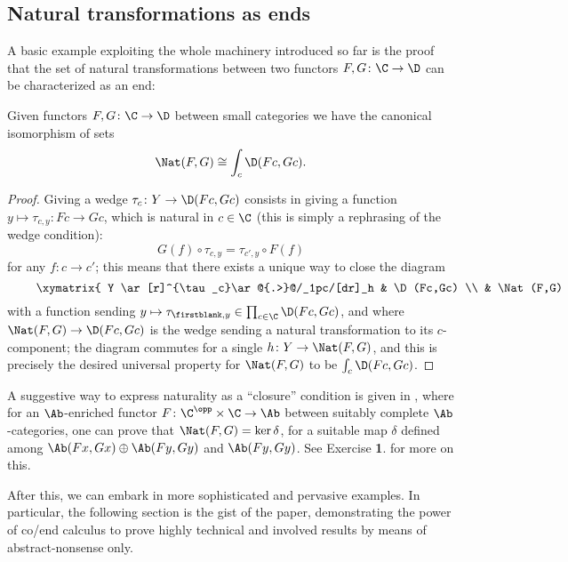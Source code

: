 \subsection{Natural transformations as ends}
A basic example exploiting the whole machinery introduced so far is the proof that the set of natural transformations between two functors $F,G\colon \C\to \D$ can be characterized as an end:
\begin{theorem}\label{naturalu}
Given functors $F,G\colon \C\to \D$ between small categories we have the canonical isomorphism of sets
\[
\Nat(F,G)\cong \int_c \D(Fc,Gc).
\]
\end{theorem}
\begin{proof}
Giving a wedge $\tau_c\colon Y\to \D(Fc,Gc)$ consists in giving a function $y\mapsto \tau_{c,y}\colon Fc\to Gc$, which is natural in $c\in \C$ (this is simply a rephrasing of the wedge condition):
\[
G(f)\circ \tau_{c,y} = \tau_{c',y}\circ F(f)
\]
for any $f\colon c\to c'$; this means that there exists a unique way to close the diagram
\[
\vcenter{\xymatrix{
Y \ar[r]^{\tau_c}\ar@{.>}@/_1pc/[dr]_h & \D(Fc,Gc)  \\
 & \Nat(F,G) \ar[u]
}}
\]
with a function sending $y\mapsto \tau_{\firstblank,y}\in \prod_{c\in\C} \D(Fc,Gc)$, and where $\Nat(F,G)\to\D(Fc,Gc)$ is the wedge sending a natural transformation to its $c$\hyp{}component; the diagram commutes for a single $h\colon Y\to \Nat(F,G)$, and this is precisely the desired universal property for $\Nat(F,G)$ to be $\int_c\D(Fc,Gc)$.
\end{proof}
\begin{remark}\label{keryoneda}
A suggestive way to express naturality as a ``closure'' condition is given in \cite[\textbf{4.1.1}]{yoneda}, where for an $\Ab$\hyp{}enriched functor $F\colon \C^\opp\times \C\to \Ab$ between suitably complete $\Ab$\hyp{}categories, one can prove that $\Nat(F,G)=\ker\delta$, for a suitable map $\delta$ defined among $\Ab(Fx, Gx)\oplus \Ab(Fy, Gy)$ and $\Ab(Fy, Gy)$. See Exercise \textbf{1}. for more on this.
\end{remark}
After this, we can embark in more sophisticated and pervasive examples. In particular, the following section is the gist of the paper, demonstrating the power of co/end calculus to prove highly technical and involved results by means of abstract\hyp{}nonsense only.
